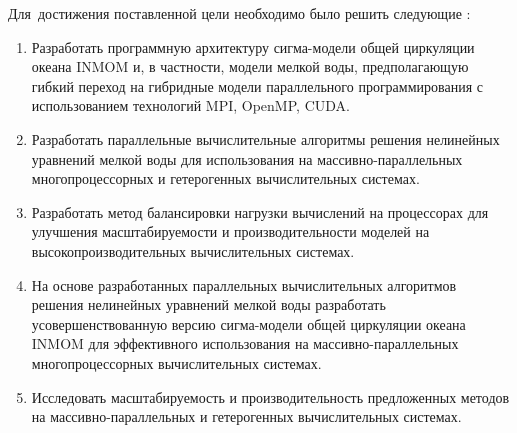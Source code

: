 Для~достижения поставленной цели необходимо было решить следующие {\tasks}:
\begin{enumerate}[beginpenalty=10000] %
    \item Разработать программную архитектуру сигма-модели общей циркуляции океана INMOM и, в частности, модели мелкой воды, предполагающую гибкий переход на гибридные модели параллельного программирования с использованием технологий MPI, OpenMP, CUDA.
    \item Разработать параллельные вычислительные алгоритмы решения нелинейных уравнений мелкой воды для использования на массивно-параллельных многопроцессорных и гетерогенных вычислительных системах.
    \item Разработать метод балансировки нагрузки вычислений на процессорах для улучшения масштабируемости и производительности моделей на высокопроизводительных вычислительных системах.
    \item На основе разработанных параллельных вычислительных алгоритмов решения нелинейных уравнений мелкой воды разработать усовершенствованную версию сигма-модели общей циркуляции океана INMOM для эффективного использования на массивно-параллельных многопроцессорных вычислительных системах.
    \item Исследовать масштабируемость и производительность предложенных методов на массивно-параллельных и гетерогенных вычислительных системах. 
\end{enumerate}

